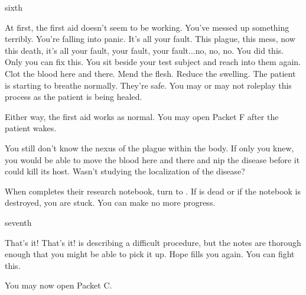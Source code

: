 \documentclass[greennotebook]{Pestilence} %
\begin{document}
\begin{page}{sixth}

At first, the first aid doesn't seem to be working. You've messed up something terribly. You're falling into panic. It's all your fault. This plague, this mess, now this death, it's all your fault, your fault, your fault...no, no, no. You did this. Only you can fix this. You sit beside your test subject and reach into them again. Clot the blood here and there. Mend the flesh. Reduce the swelling. The patient is starting to breathe normally. They're safe. You may or may not roleplay this process as the patient is being healed. 

Either way, the first aid works as normal. You may open Packet F after the patient wakes. 

You still don't know the nexus of the plague within the body. If only you knew, you would be able to move the blood here and there and nip the disease before it could kill its host. Wasn't \cOutsider{} studying the localization of the disease?

When \cOutsider{} completes their research notebook, turn to . If \cOutsider{} is dead or if the notebook is destroyed, you are stuck. You can make no more progress.

\end{page}

\begin{page}{seventh}

That's it! That's it! \cOutsider{\They} is describing a difficult procedure, but the notes are thorough enough that you might be able to pick it up. Hope fills you again. You can fight this.

You may now open Packet C.

\end{page}

\endnotebook
\end{document}
